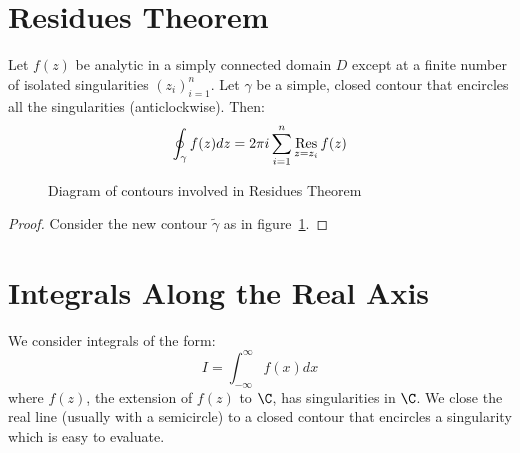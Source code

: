 \documentclass[../Main.tex]{subfiles}
\begin{document}
\section{Residues Theorem}
\begin{theorem}
    Let $f(z)$ be analytic in a simply connected domain $D$ except at a finite number of isolated singularities $(z_i)_{i=1}^n$. Let $\gamma$ be a simple, closed contour that encircles all the singularities (anticlockwise). Then:
    \begin{equation*}
        \oint_{\gamma} f(z) dz = 2\pi i \sum_{i=1}^{n} \operatorname*{Res}_{z = z_i} f(z)
    \end{equation*}
    \label{thmResidues}
\end{theorem}
\begin{figure}
    \centering
    \caption{Diagram of contours involved in Residues Theorem}
    \label{figResiduesDiagram}
\end{figure}
\begin{proof}
    Consider the new contour $\tilde{\gamma}$ as in figure~\ref{figResiduesDiagram}.
\end{proof}
\section{Integrals Along the Real Axis}
We consider integrals of the form:
\begin{equation*}
    I = \int_{-\infty}^{\infty} f(x) dx
\end{equation*}
where $f(z)$, the extension of $f(z)$ to $\C$, has singularities in $\C$. We close the real line (usually with a semicircle) to a closed contour that encircles a singularity which is easy to evaluate.
\end{document}
